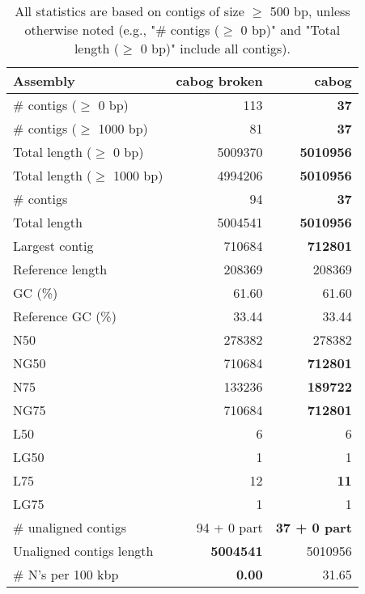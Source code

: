 \documentclass[12pt,a4paper]{article}
\begin{document}
\begin{table}[ht]
\begin{center}
\caption{All statistics are based on contigs of size $\geq$ 500 bp, unless otherwise noted (e.g., "\# contigs ($\geq$ 0 bp)" and "Total length ($\geq$ 0 bp)" include all contigs).}
\begin{tabular}{|l*{2}{|r}|}
\hline
Assembly & cabog broken & cabog \\ \hline
\# contigs ($\geq$ 0 bp) & 113 & {\bf 37} \\ \hline
\# contigs ($\geq$ 1000 bp) & 81 & {\bf 37} \\ \hline
Total length ($\geq$ 0 bp) & 5009370 & {\bf 5010956} \\ \hline
Total length ($\geq$ 1000 bp) & 4994206 & {\bf 5010956} \\ \hline
\# contigs & 94 & {\bf 37} \\ \hline
Total length & 5004541 & {\bf 5010956} \\ \hline
Largest contig & 710684 & {\bf 712801} \\ \hline
Reference length & 208369 & 208369 \\ \hline
GC (\%) & 61.60 & 61.60 \\ \hline
Reference GC (\%) & 33.44 & 33.44 \\ \hline
N50 & 278382 & 278382 \\ \hline
NG50 & 710684 & {\bf 712801} \\ \hline
N75 & 133236 & {\bf 189722} \\ \hline
NG75 & 710684 & {\bf 712801} \\ \hline
L50 & 6 & 6 \\ \hline
LG50 & 1 & 1 \\ \hline
L75 & 12 & {\bf 11} \\ \hline
LG75 & 1 & 1 \\ \hline
\# unaligned contigs & 94 + 0 part & {\bf 37 + 0 part} \\ \hline
Unaligned contigs length & {\bf 5004541} & 5010956 \\ \hline
\# N's per 100 kbp & {\bf 0.00} & 31.65 \\ \hline
\end{tabular}
\end{center}
\end{table}
\end{document}
